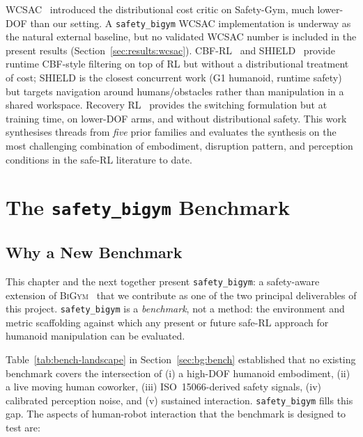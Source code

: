 \documentclass[11pt,a4paper]{report}
\newcommand{\iso}{ISO~15066}
\newcommand{\bigym}{\textsc{BiGym}}
\newcommand{\sbigym}{\texttt{safety\_bigym}}
\begin{document}
WCSAC~\cite{yang2021wcsac} introduced the distributional cost
critic on Safety-Gym, much lower-DOF than our setting. A
\sbigym{} WCSAC implementation is underway as the natural external
baseline, but no validated WCSAC number is included in the present
results (Section~\ref{sec:results:wcsac}). CBF-RL~\cite{cbfrl2024} and
SHIELD~\cite{shield2025} provide runtime CBF-style filtering on top
of RL but without a distributional treatment of cost; SHIELD is the
closest concurrent work (G1 humanoid, runtime safety) but targets
navigation around humans/obstacles rather than manipulation in a
shared workspace. Recovery RL~\cite{thananjeyan2021recovery}
provides the switching formulation but at training time, on
lower-DOF arms, and without distributional safety. This work
synthesises threads from \emph{five} prior families and evaluates
the synthesis on the most challenging combination of embodiment,
disruption pattern, and perception conditions in the safe-RL
literature to date.

\chapter{The \texorpdfstring{\sbigym{}}{safety\_bigym} Benchmark}
\label{ch:benchmark-env}

\section{Why a New Benchmark}
\label{sec:bench:why}

This chapter and the next together present \sbigym{}: a safety-aware
extension of \bigym{}~\cite{chernyadev2024bigym} that we contribute
as one of the two principal deliverables of this project. \sbigym{}
is a \emph{benchmark}, not a method: the environment and
metric scaffolding against which any present or future safe-RL
approach for humanoid manipulation can be evaluated.

Table~\ref{tab:bench-landscape} in Section~\ref{sec:bg:bench}
established that no existing benchmark covers the intersection of
(i) a high-DOF humanoid embodiment, (ii) a live moving human
coworker, (iii) \iso{}-derived safety signals, (iv) calibrated
perception noise, and (v) sustained interaction. \sbigym{} fills
this gap. The aspects of human-robot interaction that the
benchmark is designed to test are:
\end{document}
